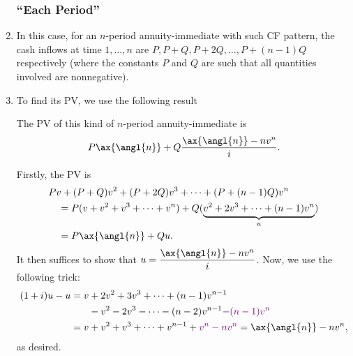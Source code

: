 \begin{enumerate}
\subsubsection*{``Each Period''}
\item \label{it:annuity-as-gen-form}
In this case, for an \(n\)-period annuity-immediate with such CF pattern,
the cash inflows at time \(1,\dotsc,n\) are \(P, P+Q, P+2Q,\dotsc,P+(n-1)Q\)
respectively (where the constants \(P\) and \(Q\) are such that all quantities
involved are nonnegative).
\begin{center}
\end{center}
\item To find its PV, we use the following result
\begin{proposition}
\label{prp:pv-as-annuity-imm}
The PV of this kind of \(n\)-period annuity-immediate is
\[
P\ax{\angl{n}}+Q\frac{\ax{\angl{n}}-nv^n}{i}.
\]
\end{proposition}
\begin{pf}
Firstly, the PV is
\begin{align*}
&Pv+(P+Q)v^{2}+(P+2Q)v^{3}+\dotsb+(P+(n-1)Q)v^{n} \\
&\quad=P(v+v^2+v^3+\dotsb+v^n)+Q(\underbrace{v^2+2v^3+\dotsb+(n-1)v^n}_{u}) \\
&\quad=P\ax{\angl{n}}+Qu.
\end{align*}
It then suffices to show that \(\displaystyle u=\frac{\ax{\angl{n}}-nv^n}{i}\).
Now, we use the following trick:
\begin{align*}
(1+i)u-u = v&+2v^2+3v^3+\dotsb+(n-1)v^{n-1}\\
& -v^2-2v^3-\dotsb-(n-2)v^{n-1}{\color{violet}-(n-1)v^n} \\
=v&+v^2+v^3+\dotsb+v^{n-1}+{\color{violet}v^n-nv^n}
=\ax{\angl{n}}-nv^n,
\end{align*}
as desired.
\end{pf}


\end{enumerate}
